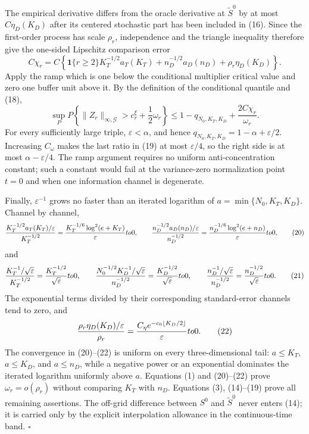 The empirical derivative differs from the oracle derivative at
\(\widetilde S^0\) by at most \(C\eta_D(K_D)\) after its centered stochastic
part has been included in (16).  Since the first-order process has scale
\(\rho_r\), independence and the triangle inequality therefore give the
one-sided Lipschitz comparison error
\[
 C\chi_r=C\left\{\mathbf 1\{r\ge2\}K_T^{-1/2}a_T(K_T)
 +n_D^{-1/2}a_D(n_D)+\rho_r\eta_D(K_D)\right\}.              \tag{18}
\]
Apply the ramp which is one below the conditional multiplier critical
value and zero one buffer unit above it.  By the definition of the
conditional quantile and (18),
\[
 \sup_P P\!\left\{\|Z_r\|_{\infty,\mathcal G}>
 c_r^\xi+\frac12\omega_r\right\}
 \le1-q_{N_0,K_T,K_D}+\frac{2C\chi_r}{\omega_r}.             \tag{19}
\]
For every sufficiently large triple, \(\varepsilon<\alpha\), and hence
\(q_{N_0,K_T,K_D}=1-\alpha+\varepsilon/2\).  Increasing \(C_\omega\)
makes the last ratio in (19) at most \(\varepsilon/4\), so the right side
is at most \(\alpha-\varepsilon/4\).  The ramp argument requires no uniform
anti-concentration constant; such a constant would fail at the
variance-zero normalization point \(t=0\) and when one information channel
is degenerate.

Finally, \(\varepsilon^{-1}\) grows no faster than an iterated logarithm of
\(a=\min\{N_0,K_T,K_D\}\).  Channel by channel,
\[
 \frac{K_T^{-1/2}a_T(K_T)/\varepsilon}{K_T^{-1/2}}
 =\frac{K_T^{-1/6}\log^2(e+K_T)}{\varepsilon}\\to0,
 \qquad
 \frac{n_D^{-1/2}a_D(n_D)/\varepsilon}{n_D^{-1/2}}
 =\frac{n_D^{-1/6}\log^2(e+n_D)}{\varepsilon}\\to0,          \tag{20}
\]
and
\[
 \frac{K_T^{-1}/\sqrt\varepsilon}{K_T^{-1/2}}
 =\frac{K_T^{-1/2}}{\sqrt\varepsilon}\\to0,
 \qquad
 \frac{N_0^{-1/2}K_D^{-1}/\sqrt\varepsilon}{n_D^{-1/2}}
 =\frac{K_D^{-1/2}}{\sqrt\varepsilon}\\to0,
 \qquad
 \frac{n_D^{-1}/\sqrt\varepsilon}{n_D^{-1/2}}
 =\frac{n_D^{-1/2}}{\sqrt\varepsilon}\\to0.                 \tag{21}
\]
The exponential terms divided by their corresponding standard-error
channels tend to zero, and
\[
 \frac{\rho_r\eta_D(K_D)/\varepsilon}{\rho_r}
 =\frac{C_\eta e^{-c_0\lfloor K_D/2\rfloor}}{\varepsilon}
 \\to0.                                                       \tag{22}
\]
The convergence in (20)--(22) is uniform on every three-dimensional tail:
\(a\le K_T\), \(a\le K_D\), and \(a\le n_D\), while a negative power or an
exponential dominates the iterated logarithm uniformly above \(a\).
Equations (1) and (20)--(22) prove \(\omega_r=o(\rho_r)\) without comparing
\(K_T\) with \(n_D\).  Equations (3), (14)--(19) prove all remaining
assertions.  The off-grid difference between \(S^0\) and
\(\widetilde S^0\) never enters (14); it is carried only by the explicit
interpolation allowance in the continuous-time band. \(\square\)